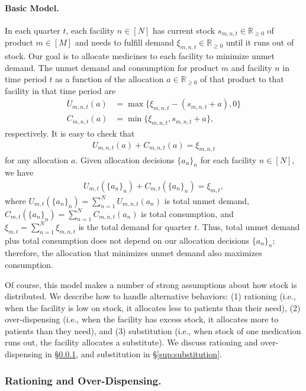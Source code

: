 \documentclass[12pt]{article}
\begin{document}
\paragraph{Basic Model.} In each quarter $t$, each facility $n\in[N]$ has current stock $s_{m,n,t}\in\mathbb{R}_{\ge0}$ of product $m\in[M]$ and needs to fulfill demand $\xi_{m,n,t}\in\mathbb{R}_{\ge0}$ until it runs out of stock. Our goal is to allocate medicines to each facility to minimize unmet demand. The unmet demand and consumption for product $m$ and facility $n$ in time period $t$ as a function of the allocation $a\in\mathbb{R}_{\ge0}$ of that product to that facility in that time period are
\begin{align*}
U_{m,n,t}(a)&=\max\{\xi_{m,n,t}-(s_{m,n,t}+a),0\} \\
C_{m,n,t}(a)&=\min\{\xi_{m,n,t},s_{m,n,t}+a\},
\end{align*}
respectively.
It is easy to check that
\begin{align*}
U_{m,n,t}(a)+C_{m,n,t}(a)=\xi_{m,n,t}
\end{align*}
for any allocation $a$. Given allocation decisions $\{a_n\}_n$ for each facility $n\in[N]$, we have
\begin{align*}
U_{m,t}(\{a_n\}_n)+C_{m,t}(\{a_n\}_n)=\xi_{m,t},
\end{align*}
where $U_{m,t}(\{a_n\}_n)=\sum_{n=1}^NU_{m,n,t}(a_n)$ is total unmet demand, $C_{m,t}(\{a_n\}_n)=\sum_{n=1}^NC_{m,n,t}(a_n)$ is total consumption, and $\xi_{m,t}=\sum_{n=1}^N\xi_{m,n,t}$ is the total demand for quarter $t$. Thus, total unmet demand plus total consumption does not depend on our allocation decisions $\{a_n\}_n$; therefore, the allocation that minimizes unmet demand also maximizes consumption.

Of course, this model makes a number of strong assumptions about how stock is distributed. We describe how to handle alternative behaviors: (1) rationing (i.e., when the facility is low on stock, it allocates less to patients than their need), (2) over-dispensing (i.e., when the facility has excess stock, it allocates more to patients than they need), and (3) substitution (i.e., when stock of one medication runs out, the facility allocates a substitute). We discuss rationing and over-dispensing in \S\ref{sup:rationing}, and substitution in \S\ref{sup:substitution}.

\subsubsection{Rationing and Over-Dispensing.}
\label{sup:rationing}
\end{document}
